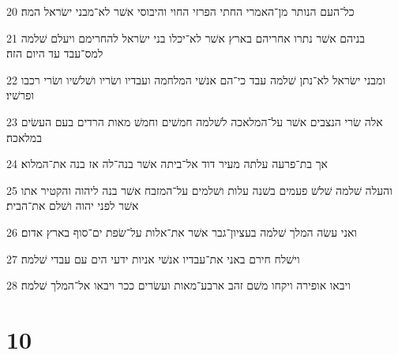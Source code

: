 \par 20 כל־העם הנותר מן־האמרי החתי הפרזי החוי והיבוסי אשׁר לא־מבני ישׂראל המה׃
\par 21 בניהם אשׁר נתרו אחריהם בארץ אשׁר לא־יכלו בני ישׂראל להחרימם ויעלם שׁלמה למס־עבד עד היום הזה׃
\par 22 ומבני ישׂראל לא־נתן שׁלמה עבד כי־הם אנשׁי המלחמה ועבדיו ושׂריו ושׁלשׁיו ושׂרי רכבו ופרשׁיו׃
\par 23 אלה שׂרי הנצבים אשׁר על־המלאכה לשׁלמה חמשׁים וחמשׁ מאות הרדים בעם העשׂים במלאכה׃
\par 24 אך בת־פרעה עלתה מעיר דוד אל־ביתה אשׁר בנה־לה אז בנה את־המלוא׃
\par 25 והעלה שׁלמה שׁלשׁ פעמים בשׁנה עלות ושׁלמים על־המזבח אשׁר בנה ליהוה והקטיר אתו אשׁר לפני יהוה ושׁלם את־הבית׃
\par 26 ואני עשׂה המלך שׁלמה בעציון־גבר אשׁר את־אלות על־שׂפת ים־סוף בארץ אדום׃
\par 27 וישׁלח חירם באני את־עבדיו אנשׁי אניות ידעי הים עם עבדי שׁלמה׃
\par 28 ויבאו אופירה ויקחו משׁם זהב ארבע־מאות ועשׂרים ככר ויבאו אל־המלך שׁלמה׃

\chapter{10}

